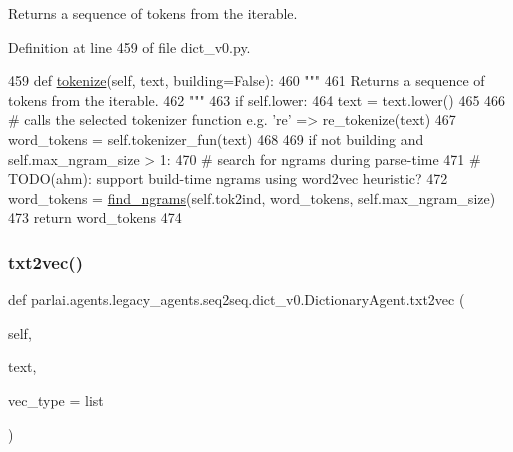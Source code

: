 \begin{DoxyVerb}Returns a sequence of tokens from the iterable.
\end{DoxyVerb}
 

Definition at line 459 of file dict\+\_\+v0.\+py.


\begin{DoxyCode}
459     \textcolor{keyword}{def }\hyperlink{namespaceparlai_1_1agents_1_1tfidf__retriever_1_1build__tfidf_a1fdb457e98eb4e4c26047e229686a616}{tokenize}(self, text, building=False):
460         \textcolor{stringliteral}{"""}
461 \textcolor{stringliteral}{        Returns a sequence of tokens from the iterable.}
462 \textcolor{stringliteral}{        """}
463         \textcolor{keywordflow}{if} self.lower:
464             text = text.lower()
465 
466         \textcolor{comment}{# calls the selected tokenizer function e.g. 're' => re\_tokenize(text)}
467         word\_tokens = self.tokenizer\_fun(text)
468 
469         \textcolor{keywordflow}{if} \textcolor{keywordflow}{not} building \textcolor{keywordflow}{and} self.max\_ngram\_size > 1:
470             \textcolor{comment}{# search for ngrams during parse-time}
471             \textcolor{comment}{# TODO(ahm): support build-time ngrams using word2vec heuristic?}
472             word\_tokens = \hyperlink{namespaceparlai_1_1agents_1_1legacy__agents_1_1seq2seq_1_1dict__v0_aa7398720bbf0f8e82c5b1495313f4f8b}{find\_ngrams}(self.tok2ind, word\_tokens, self.max\_ngram\_size)
473         \textcolor{keywordflow}{return} word\_tokens
474 
\end{DoxyCode}
\mbox{\label{classparlai_1_1agents_1_1legacy__agents_1_1seq2seq_1_1dict__v0_1_1DictionaryAgent_a5d89ed4dcebcd41853bd0614d30337e7}} 
\subsubsection{\texorpdfstring{txt2vec()}{txt2vec()}}
{\footnotesize\ttfamily def parlai.\+agents.\+legacy\+\_\+agents.\+seq2seq.\+dict\+\_\+v0.\+Dictionary\+Agent.\+txt2vec (\begin{DoxyParamCaption}\item[{}]{self,  }\item[{}]{text,  }\item[{}]{vec\+\_\+type = {\ttfamily list} }\end{DoxyParamCaption})}

